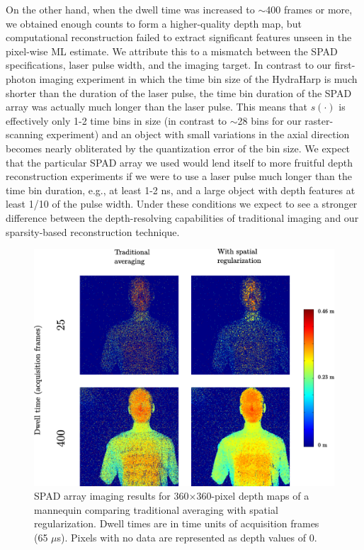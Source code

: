 On the other hand, when the dwell time was increased to $\sim$400 frames or more, we obtained enough counts to form a higher-quality depth map, but computational reconstruction failed to extract significant features unseen in the pixel-wise ML estimate. We attribute this to a mismatch between the SPAD specifications, laser pulse width, and the imaging target. In contrast to our first-photon imaging experiment in which the time bin size of the HydraHarp is much shorter than the duration of the laser pulse, the time bin duration of the SPAD array was actually much longer than the laser pulse. This means that $s(\cdot)$ is effectively only 1-2 time bins in size (in contrast to $\sim$28 bins for our raster-scanning experiment) and an object with small variations in the axial direction becomes nearly obliterated by the quantization error of the bin size. We expect that the particular SPAD array we used would lend itself to more fruitful depth reconstruction experiments if we were to use a laser pulse much longer than the time bin duration, e.g., at least 1-2 ns, and a large object with depth features at least 1/10 of the pulse width. Under these conditions we expect to see a stronger difference between the depth-resolving capabilities of traditional imaging and our sparsity-based reconstruction technique.

\begin{figure}[h!]
\centerline{\includegraphics[width=15cm]{figure-first-spad-mannequin-d.pdf}}
\caption{SPAD array imaging results for 360$\times$360-pixel depth maps of a mannequin comparing traditional averaging with spatial regularization. Dwell times are in time units of acquisition frames (65 $\mu$s). Pixels with no data are represented as depth values of $0$.}
\label{figure:first-spad-mannequin-d}
\end{figure}

